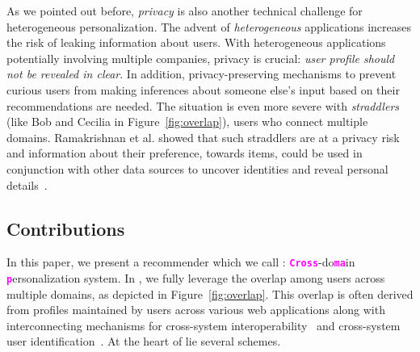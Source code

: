  As we pointed out before, \emph{privacy} is also another technical challenge for heterogeneous personalization. The advent of \emph{heterogeneous} applications increases the risk of leaking information about users. With heterogeneous applications potentially involving multiple companies, privacy is crucial: \emph{user profile should not be revealed in clear}. In addition, privacy-preserving mechanisms to prevent curious users from making inferences about someone else's input based on their recommendations are needed. The situation is even more severe with \emph{straddlers} (like Bob and Cecilia in Figure~\ref{fig:overlap}), users who connect multiple domains. Ramakrishnan et al. showed that such straddlers are at a privacy risk and information about their preference, towards items, could be used in conjunction with other data sources to uncover identities and reveal personal details~\cite{ramakrishnan2001privacy}. %



\subsection{Contributions}
In this paper, we present a recommender which we call 
 \crossrec: \textcolor{magenta}{\texttt{\bf Cross}}-do\textcolor{magenta}{\texttt{\bf ma}}in \textcolor{magenta}{\texttt{\bf p}}ersonalization system.
In \crossrec, we fully leverage the overlap among users across multiple domains, as depicted in Figure~\ref{fig:overlap}. This overlap is often derived from profiles maintained by users across various web applications along with interconnecting mechanisms for cross-system interoperability~\cite{carmagnola2011user} and cross-system user identification~\cite{carmagnola2009user}. 
At the heart of \crossrec lie several schemes. 

